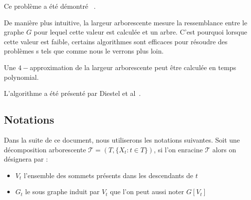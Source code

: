 \begin{nrmq}
    Ce problème a été démontré \npc~\cite{Arn87}.
\end{nrmq}

De manière plus intuitive, la largeur arborescente mesure la ressemblance entre le graphe $G$ pour
lequel cette valeur est calculée et un arbre. C'est pourquoi lorsque cette valeur est faible,
certains algorithmes sont efficaces pour résoudre des problèmes \npc s tels que \hcycle comme nous
le verrons plus loin.

\begin{nlemma}
    \label{tw_approx}
    Une $4-$approximation de la largeur arborescente peut être calculée en temps polynomial.
\end{nlemma}

L'algorithme a été présenté par Diestel et al~\cite{Die00}.

\subsection*{Notations}

Dans la suite de ce document, nous utiliserons les notations suivantes. Soit une décomposition
arborescente $\mathcal{T} = (T, \{X_t : t \in T\})$, si l'on enracine $\mathcal{T}$ alors on désignera par :
\begin{itemize}
    \item $V_t$ l'ensemble des sommets présents dans les descendants de $t$
    \item $G_t$ le sous graphe induit par $V_t$ que l'on peut aussi noter $G[V_t]$
\end{itemize}




